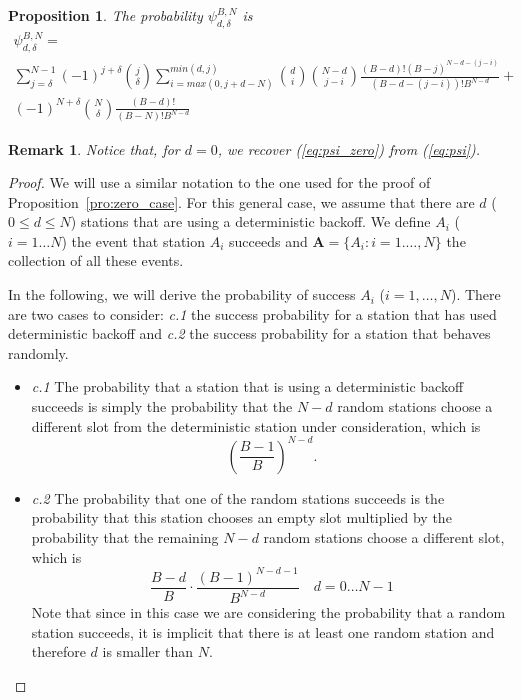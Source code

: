\documentclass[journal]{IEEEtran}
\newtheorem{proposition}{Proposition}
\newtheorem{remark}{Remark}
\begin{document}
\begin{proposition}
\label{pro:general_case}
The probability $\psi^{B,N}_{d,\delta}$ is 
\begin{equation}
\begin{split}
\psi^{B,N}_{d,\delta} = \\
\sum_{j=\delta}^{N-1} (-1)^{j+\delta} \binom{j}{\delta} 
\sum_{i=max(0,j+d-N)}^{min(d,j)} \binom{d}{i} \binom{N-d}{j-i} 
\frac{(B-d)! (B-j)^{N-d-(j-i)}}{(B-d-(j-i))! B^{N-d}}
+ \\
(-1)^{N+\delta} \binom{N}{\delta} \frac{(B-d)!}{(B-N)!B^{N-d}}
\end{split}
\label{eq:psi}
\end{equation}
\end{proposition}

\begin{remark}
Notice that, for $d=0$,  we recover (\ref{eq:psi_zero}) from (\ref{eq:psi}).
\end{remark}

\begin{proof}
We will use a similar notation to the one used for the proof of Proposition~\ref{pro:zero_case}.
For this general case, we assume that there are $d$ ($0 \leq d \leq N$) stations that are using a deterministic backoff.
We define $A_i$ ($i=1\dots N$) the event that station $A_i$ succeeds and $\mathbf{A}=\{A_i:i=1. \dots, N \}$ the collection of all these events.

In the following, we will derive the probability of success $A_i$ ($i=1,\dots ,N$). There are two cases to consider: \emph{c.1} the success probability for a station that has used deterministic backoff and \emph{c.2} the success probability for a station that behaves randomly.

\begin{itemize}
\item \emph{c.1} The probability that a station that is using a deterministic backoff succeeds is simply the probability that the $N-d$ random stations choose a different slot from the deterministic station under consideration, which is
\begin{equation}
\label{eq:success_deterministic}
\left( \frac{B-1}{B} \right)^{N-d}.
\end{equation}
\item \emph{c.2} The probability that one of the random stations succeeds is the probability that this station chooses an empty slot multiplied by the probability that the remaining $N-d$ random stations choose a different slot, which is
\begin{equation}
\label{eq:success_random}
\frac{B-d}{B} \cdot \frac{(B-1)^{N-d-1}}{B^{N-d}}
\quad
d=0 \dots N-1
\end{equation}
Note that since in this case we are considering the probability that a random station succeeds, it is implicit that there is at least one random station and therefore $d$ is smaller than $N$.
\end{itemize}
\end{proof}
\end{document}
